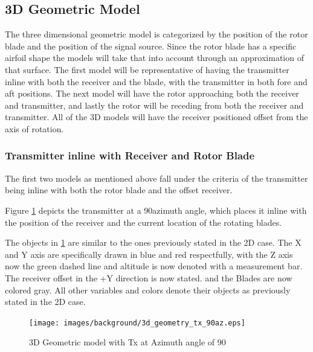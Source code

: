 \subsection{3D Geometric Model}
The three dimensional geometric model is categorized by the position of the rotor blade and the position of the signal source. Since the rotor blade has a specific airfoil shape the models will take that into account through an approximation of that surface. The first model will be representative of having the transmitter inline with both the receiver and the blade, with the transmitter in both fore and aft positions. The next model will have the rotor approaching both the receiver and transmitter, and lastly the rotor will be receding from both the receiver and transmitter. All of the 3D models will have the receiver positioned offset from the axis of rotation.

\subsubsection{Transmitter inline with Receiver and Rotor Blade}
The first two models as mentioned above fall under the criteria of the transmitter being inline with both the rotor blade and the offset receiver. 

Figure \ref{fig:3D_model_90az} depicts the transmitter at a 90\textdegree \space azimuth angle, which places it inline with the position of the receiver and the current location of the rotating blades. 

The objects in \ref{fig:3D_model_90az}  are similar to the ones previously stated in the 2D case. The X and Y axis are specifically drawn in blue and red respectfully, with the Z axis now the green dashed line and altitude is now denoted with a measurement bar. The receiver offset in the +Y direction is now stated. and the Blades are now colored gray. All other variables and colors denote their objects as previously stated in the 2D case. 

\begin{figure}
	\begin{center}
		\texttt{[image: images/background/3d\_geometry\_tx\_90az.eps]}
		\caption{3D Geometric model with Tx at Azimuth angle of 90\textdegree}
		\label{fig:3D_model_90az}
	\end{center}
\end{figure}

